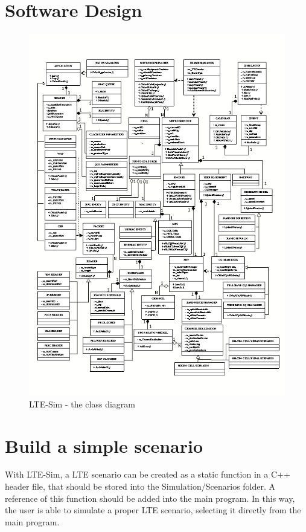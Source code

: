 \documentclass[11pt]{article}
\begin{document}
\section{Software Design} \label{design}
\begin{figure}[htp]
\centering
\includegraphics{uml.png}
\caption{LTE-Sim - the class diagram}
\end{figure}


\section{Build a simple scenario} \label{simple-scenario}

With LTE-Sim, a LTE scenario can be created as a static function in a C++ header file, that should be stored into the Simulation/Scenarios folder. A reference of this function should be added into the main program. In this way, the user is able to simulate a proper LTE scenario, selecting it directly from the main program. 
\end{document}
